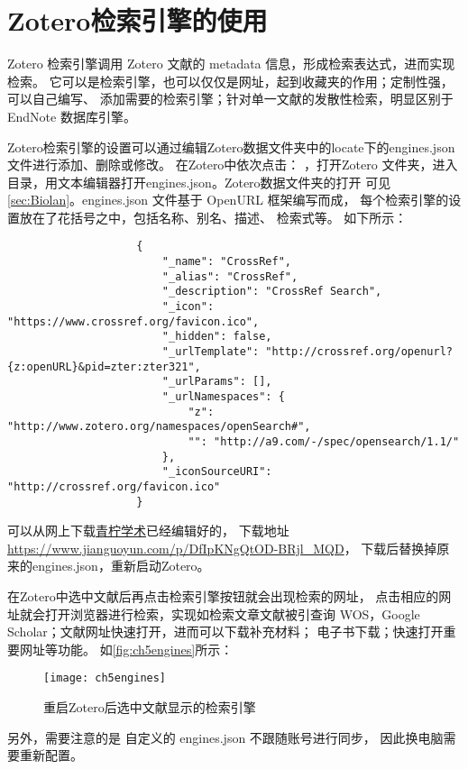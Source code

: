 \documentclass[cn,11pt,chinese]{elegantbook}
\begin{document}
				

		\section{Zotero检索引擎的使用}\label{sec:Engines}
			Zotero 检索引擎调用 Zotero 文献的 metadata 信息，形成检索表达式，进而实现检索。
			它可以是检索引擎，也可以仅仅是网址，起到收藏夹的作用；定制性强，可以自己编写、
			添加需要的检索引擎；针对单一文献的发散性检索，明显区别于 EndNote 数据库引擎。

			Zotero检索引擎的设置可以通过编辑Zotero数据文件夹中的locate下的engines.json
			文件进行添加、删除或修改。
			在Zotero中依次点击：
			，打开Zotero 
			文件夹，进入目录，用文本编辑器打开engines.json。Zotero数据文件夹的打开
			可见\cref{sec:Biolan}。engines.json 文件基于 OpenURL 框架编写而成，
			每个检索引擎的设置放在了花括号之中，包括名称、别名、描述、
			检索式等。
			如下所示：
				\begin{lstlisting}
					{
						"_name": "CrossRef",
						"_alias": "CrossRef",
						"_description": "CrossRef Search",
						"_icon": "https://www.crossref.org/favicon.ico",
						"_hidden": false,
						"_urlTemplate": "http://crossref.org/openurl?{z:openURL}&pid=zter:zter321",
						"_urlParams": [],
						"_urlNamespaces": {
							"z": "http://www.zotero.org/namespaces/openSearch#",
							"": "http://a9.com/-/spec/opensearch/1.1/"
						},
						"_iconSourceURI": "http://crossref.org/favicon.ico"
					}

				\end{lstlisting}
			
			
				可以从网上下载\href{https://www.zhihu.com/people/iseex/answers
			}{青柠学术}已经编辑好的，
			下载地址\url{https://www.jianguoyun.com/p/DfIpKNgQtOD-BRjl_MQD}，
			下载后替换掉原来的engines.json，重新启动Zotero。

			在Zotero中选中文献后再点击检索引擎按钮就会出现检索的网址，
			点击相应的网址就会打开浏览器进行检索，实现如检索文章文献被引查询
			WOS，Google Scholar；文献网址快速打开，进而可以下载补充材料；
			电子书下载；快速打开重要网址等功能。	
			如\autoref{fig:ch5engines}所示：
				\begin{figure}[ht]
					\centering
					\texttt{[image: ch5engines]}
					\caption{重启Zotero后选中文献显示的检索引擎}
					\label{fig:ch5engines}
				\end{figure}
			另外，需要注意的是
		自定义的 engines.json 不跟随账号进行同步，
		因此换电脑需要重新配置。
\end{document}
